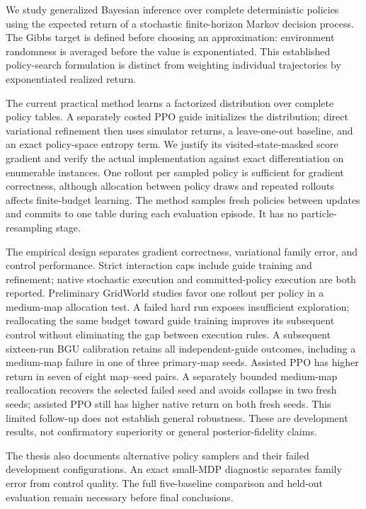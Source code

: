 We study generalized Bayesian inference over complete deterministic policies
using the expected return of a stochastic finite-horizon Markov decision
process. The Gibbs target is defined before choosing an approximation:
environment randomness is averaged before the value is exponentiated.
This established policy-search formulation is distinct from weighting
individual trajectories by exponentiated realized return.

The current practical method learns a factorized distribution over complete
policy tables. A separately costed PPO guide initializes the distribution;
direct variational refinement then uses simulator returns, a leave-one-out
baseline, and an exact policy-space entropy term. We justify its
visited-state-masked score gradient and verify the actual implementation
against exact differentiation on enumerable instances. One rollout per
sampled policy is sufficient for gradient correctness, although allocation
between policy draws and repeated rollouts affects finite-budget learning.
The method samples fresh policies between updates and commits to one table
during each evaluation episode. It has no particle-resampling stage.

The empirical design separates gradient correctness, variational family
error, and control performance. Strict interaction caps include guide
training and refinement; native stochastic execution and committed-policy
execution are both reported. Preliminary GridWorld studies favor one
rollout per policy in a medium-map allocation test. A failed hard
run exposes insufficient exploration; reallocating the same budget toward
guide training improves its subsequent control without eliminating the gap
between execution rules. A subsequent sixteen-run BGU calibration retains
all independent-guide outcomes, including a medium-map failure in one of three
primary-map seeds. Assisted PPO has higher return in seven of eight map--seed
pairs. A separately bounded medium-map reallocation recovers the selected
failed seed and avoids collapse in two fresh seeds; assisted PPO still has
higher native return on both fresh seeds. This limited follow-up does not
establish general robustness. These are development results, not confirmatory superiority
or general posterior-fidelity claims.

The thesis also documents alternative policy samplers and their failed
development configurations. An exact small-MDP diagnostic separates family
error from control quality. The full five-baseline comparison and held-out
evaluation remain necessary before final conclusions.

